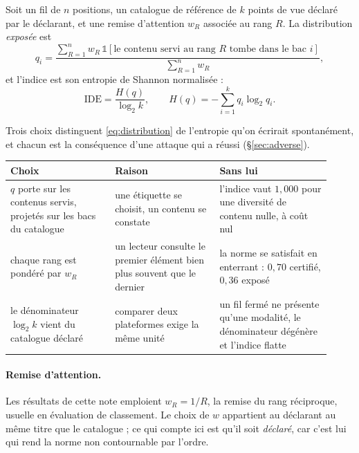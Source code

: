 \documentclass[11pt,a4paper]{article}
\begin{document}
Soit un fil de $n$ positions, un catalogue de référence de $k$ points de vue déclaré par le
déclarant, et une remise d'attention $w_R$ associée au rang $R$. La distribution
\emph{exposée} est
\begin{equation}
q_i = \frac{\sum_{R=1}^{n} w_R \, \mathbb{1}\!\left[\text{le contenu servi au rang } R
      \text{ tombe dans le bac } i\right]}{\sum_{R=1}^{n} w_R},
\label{eq:distribution}
\end{equation}
et l'indice est son entropie de Shannon normalisée :
\begin{equation}
\mathrm{IDE} = \frac{H(q)}{\log_2 k}, \qquad H(q) = -\sum_{i=1}^{k} q_i \log_2 q_i .
\label{eq:ide}
\end{equation}

Trois choix distinguent \eqref{eq:distribution} de l'entropie qu'on écrirait spontanément,
et chacun est la conséquence d'une attaque qui a réussi (\S\ref{sec:adverse}).

\begin{center}
\begin{tabular}{@{}p{0.30\linewidth}p{0.30\linewidth}p{0.32\linewidth}@{}}
\toprule
\textbf{Choix} & \textbf{Raison} & \textbf{Sans lui} \\
\midrule
$q$ porte sur les contenus servis, projetés sur les bacs du catalogue & une étiquette se
choisit, un contenu se constate & l'indice vaut $1{,}000$ pour une diversité de contenu
nulle, à coût nul \\[2mm]
chaque rang est pondéré par $w_R$ & un lecteur consulte le premier élément bien plus souvent
que le dernier & la norme se satisfait en enterrant : $0{,}70$ certifié, $0{,}36$ exposé \\[2mm]
le dénominateur $\log_2 k$ vient du catalogue déclaré & comparer deux plateformes exige la
même unité & un fil fermé ne présente qu'une modalité, le dénominateur dégénère et l'indice
flatte \\
\bottomrule
\end{tabular}
\end{center}

\paragraph{Remise d'attention.} Les résultats de cette note emploient $w_R = 1/R$, la remise
du rang réciproque, usuelle en évaluation de classement. Le choix de $w$ appartient au
déclarant au même titre que le catalogue ; ce qui compte ici est qu'il soit \emph{déclaré},
car c'est lui qui rend la norme non contournable par l'ordre.
\end{document}
